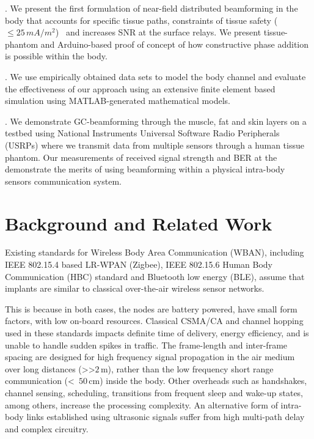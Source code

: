 . We present the first formulation of near-field distributed beamforming in the body that accounts for specific tissue paths, constraints of tissue safety ($\le 25\, mA/m^2$)~\cite{ICNIRP} and increases SNR at the surface relays. We present tissue-phantom and Arduino-based proof of concept of how constructive phase addition is possible within the body.

. We use empirically obtained data sets to model the body channel and evaluate the effectiveness of our approach using an extensive finite element based simulation using MATLAB-generated mathematical models. 

. We demonstrate GC-beamforming through the muscle, fat and skin layers on a testbed using National Instruments Universal Software Radio Peripherals (USRPs) where we transmit data from multiple sensors through a human tissue phantom. Our measurements of received signal strength and BER at the demonstrate the merits of using beamforming within a physical intra-body sensors communication system.

\section{Background and Related Work}\label{sec:bg}
Existing standards for Wireless Body Area Communication (WBAN), including IEEE 802.15.4 based LR-WPAN (Zigbee), IEEE 802.15.6 Human Body Communication (HBC) standard and  Bluetooth low energy (BLE), assume that implants are similar to classical over-the-air wireless sensor networks. 

This is because in both cases, the nodes are battery powered, have small form factors, with low on-board resources. Classical CSMA/CA \cite{ieee802,backoff} and channel hopping used in these standards impacts definite time of delivery, energy efficiency, and is unable to handle sudden spikes in traffic. The frame-length and inter-frame spacing are designed for high frequency signal propagation in the air medium over long distances (\textgreater\textgreater  $2\,\mathrm{m}$), rather than the low frequency short range communication (\textless \  $50\,\mathrm{cm}$) inside the body. Other overheads such as handshakes, channel sensing, scheduling, transitions from frequent sleep and wake-up states, among others, increase the processing complexity. An alternative form of intra-body links established using ultrasonic signals suffer from high multi-path delay and complex circuitry.


